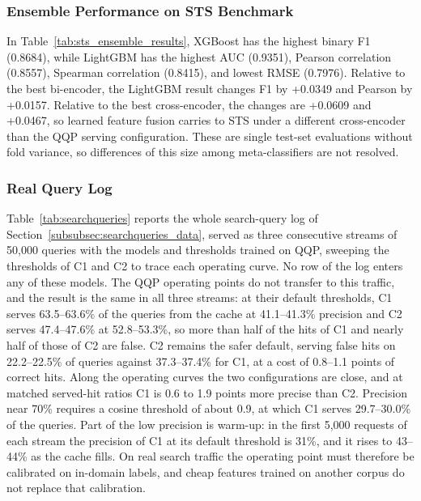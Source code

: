 \documentclass[authoryear,preprint,review,12pt]{elsarticle}
\begin{document}
\subsubsection{Ensemble Performance on STS Benchmark}
In Table~\ref{tab:sts_ensemble_results}, XGBoost has the highest binary F1 (0.8684), while LightGBM has the highest AUC (0.9351), Pearson correlation (0.8557), Spearman correlation (0.8415), and lowest RMSE (0.7976). Relative to the best bi-encoder, the LightGBM result changes F1 by +0.0349 and Pearson by +0.0157. Relative to the best cross-encoder, the changes are +0.0609 and +0.0467, so learned feature fusion carries to STS under a different cross-encoder than the QQP serving configuration. These are single test-set evaluations without fold variance, so differences of this size among meta-classifiers are not resolved.

\subsubsection{Real Query Log}
\label{subsec:real_query_log}
Table~\ref{tab:searchqueries} reports the whole search-query log of Section~\ref{subsubsec:searchqueries_data}, served as three consecutive streams of 50,000 queries with the models and thresholds trained on QQP, sweeping the thresholds of C1 and C2 to trace each operating curve. No row of the log enters any of these models. The QQP operating points do not transfer to this traffic, and the result is the same in all three streams: at their default thresholds, C1 serves 63.5--63.6\% of the queries from the cache at 41.1--41.3\% precision and C2 serves 47.4--47.6\% at 52.8--53.3\%, so more than half of the hits of C1 and nearly half of those of C2 are false. C2 remains the safer default, serving false hits on 22.2--22.5\% of queries against 37.3--37.4\% for C1, at a cost of 0.8--1.1 points of correct hits. Along the operating curves the two configurations are close, and at matched served-hit ratios C1 is 0.6 to 1.9 points more precise than C2. Precision near 70\% requires a cosine threshold of about 0.9, at which C1 serves 29.7--30.0\% of the queries. Part of the low precision is warm-up: in the first 5,000 requests of each stream the precision of C1 at its default threshold is 31\%, and it rises to 43--44\% as the cache fills. On real search traffic the operating point must therefore be calibrated on in-domain labels, and cheap features trained on another corpus do not replace that calibration.
\end{document}

